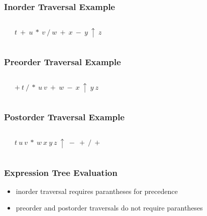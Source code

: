\documentclass[dvipsnames]{beamer}
\begin{document}
\begin{frame}
  \frametitle{Inorder Traversal Example}

  \begin{columns}
    \begin{center}
    \end{center}

    $t ~ + ~ u ~ * ~ v ~ / ~ w ~ + ~ x ~ - ~ y ~ \uparrow ~ z$
  \end{columns}
\end{frame}

\begin{frame}
  \frametitle{Preorder Traversal Example}

  \begin{columns}
    \begin{center}
    \end{center}

    $+ ~ t ~ / ~ * ~ u ~ v ~ + ~ w ~ - ~ x ~ \uparrow ~ y ~ z$
  \end{columns}
\end{frame}

\begin{frame}
  \frametitle{Postorder Traversal Example}

  \begin{columns}
    \begin{center}
    \end{center}

    $t ~ u ~ v ~ * ~ w ~ x ~ y ~ z ~ \uparrow ~ - ~ + ~ / ~ +$
  \end{columns}
\end{frame}

\begin{frame}
  \frametitle{Expression Tree Evaluation}

  \begin{itemize}
    \item inorder traversal requires parantheses for precedence
    \item preorder and postorder traversals do not require parantheses
  \end{itemize}
\end{frame}
\end{document}
